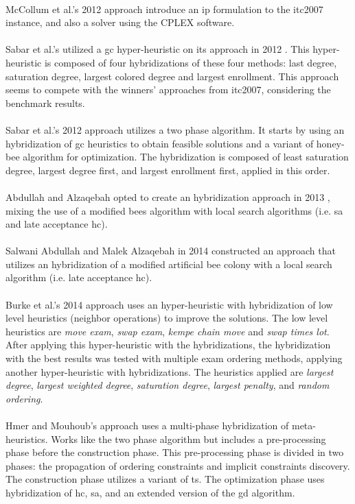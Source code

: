 \\
McCollum et al.'s 2012 approach \cite{McCollum2012} introduce an \gls{ip} formulation to the \gls{itc2007} instance, and also a solver using the CPLEX software.\\
\\
Sabar et al.'s utilized a \gls{gc} hyper-heuristic on its approach in 2012 \cite{Sabar2012}. This hyper-heuristic is composed of four hybridizations of these four methods: last degree, saturation degree, largest colored degree and largest enrollment. This approach seems to compete with the winners' approaches from \gls{itc2007}, considering the benchmark results.\\
\\
Sabar et al.'s 2012 approach \cite{Sabar2012a} utilizes a two phase algorithm. It starts by using an hybridization of \gls{gc} heuristics to obtain feasible solutions and a variant of honey-bee algorithm for optimization. The hybridization is composed of least saturation degree, largest degree first, and largest enrollment first, applied in this order.\\
\\
Abdullah and Alzaqebah opted to create an hybridization approach in 2013 \cite{Abdullah2013}, mixing the use of a modified bees algorithm with local search algorithms (i.e. \gls{sa} and late acceptance \gls{hc}).\\
\\
Salwani Abdullah and Malek Alzaqebah in 2014 constructed an approach \cite{Alzaqebah2014} that utilizes an hybridization of a modified artificial bee colony with a local search algorithm (i.e. late acceptance \gls{hc}).\\
\\
Burke et al.'s 2014 approach \cite{Burke2014} uses an hyper-heuristic with hybridization of low level heuristics (neighbor operations) to improve the solutions. The low level heuristics are \textit{move exam}, \textit{swap exam}, \textit{kempe chain move} and \textit{swap times lot}. After applying this hyper-heuristic with the hybridizations, the hybridization with the best results was tested with multiple exam ordering methods, applying another hyper-heuristic with hybridizations. The heuristics applied are \textit{largest degree}, \textit{largest weighted degree}, \textit{saturation degree}, \textit{largest penalty}, and \textit{random ordering}.\\
\\
Hmer and Mouhoub's approach \cite{Mouhoub2014} uses a multi-phase hybridization of meta-heuristics. Works like the two phase algorithm but includes a pre-processing phase before the construction phase. This pre-processing phase is divided in two phases: the propagation of ordering constraints and implicit constraints discovery. The construction phase utilizes a variant of \gls{ts}. The optimization phase uses hybridization of \gls{hc}, \gls{sa}, and an extended version of the \gls{gd} algorithm.\\
